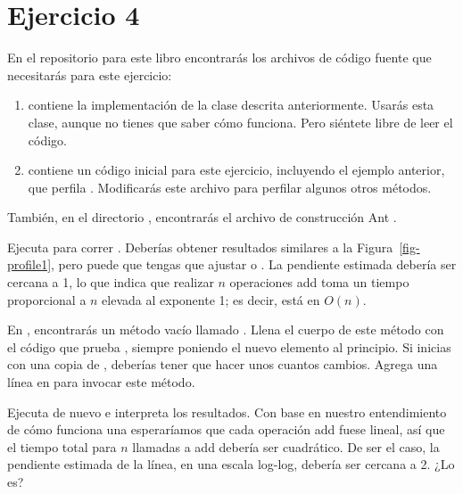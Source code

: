 \documentclass[12pt]{book}
\theoremstyle{exercise}
\begin{document}


\section{Ejercicio 4}
\label{instructions-4}

En el repositorio para este libro encontrarás los archivos de código fuente que
necesitarás para este ejercicio:

\begin{enumerate}

\item
   contiene la implementación de la clase
   descrita anteriormente. Usarás esta clase, aunque no
  tienes que saber cómo funciona. Pero siéntete libre de leer el código.

\item
   contiene un código inicial para este ejercicio,
  incluyendo el ejemplo anterior, que perfila
  . Modificarás este archivo para perfilar algunos
  otros métodos.

\end{enumerate}


También, en el directorio , encontrarás el archivo de
construcción Ant .

Ejecuta  para correr . Deberías
obtener resultados similares a la Figura~\ref{fig-profile1}, pero puede que tengas que
ajustar  o . La pendiente estimada debería ser cercana
a 1, lo que indica que realizar $n$ operaciones add toma un tiempo proporcional
a $n$ elevada al exponente 1; es decir, está en $O(n)$.

En , encontrarás un método vacío llamado
. Llena el cuerpo de este método
con el código que prueba , siempre poniendo el nuevo
elemento al principio. Si inicias con una copia de ,
deberías tener que hacer unos cuantos cambios. Agrega una línea en
 para invocar este método.

Ejecuta  de nuevo e interpreta los resultados. Con base en
nuestro entendimiento de cómo funciona una  esperaríamos que cada
operación add fuese lineal, así que el tiempo total para $n$ llamadas a add debería ser
cuadrático. De ser el caso, la pendiente estimada de la línea, en una escala log-log,
debería ser cercana a 2. ¿Lo es?
\end{document}
